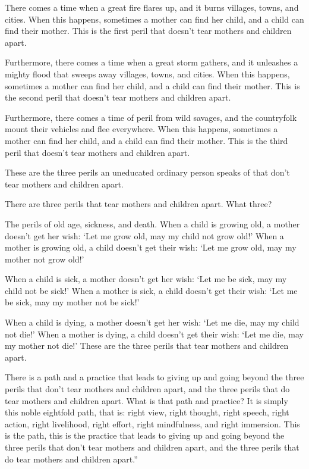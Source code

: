 \documentclass[12pt,openany]{book}%
\begin{document}
There comes a time when a great fire flares up, and it burns villages, towns, and cities. When this happens, sometimes a mother can find her child, and a child can find their mother. This is the first peril that doesn’t tear mothers and children apart. 

Furthermore, there comes a time when a great storm gathers, and it unleashes a mighty flood that sweeps away villages, towns, and cities. When this happens, sometimes a mother can find her child, and a child can find their mother. This is the second peril that doesn’t tear mothers and children apart. 

Furthermore, there comes a time of peril from wild savages, and the countryfolk mount their vehicles and flee everywhere. When this happens, sometimes a mother can find her child, and a child can find their mother. This is the third peril that doesn’t tear mothers and children apart. 

These are the three perils an uneducated ordinary person speaks of that don’t tear mothers and children apart. 

There are three perils that tear mothers and children apart. What three? 

The perils of old age, sickness, and death. When a child is growing old, a mother doesn’t get her wish: ‘Let me grow old, may my child not grow old!’ When a mother is growing old, a child doesn’t get their wish: ‘Let me grow old, may my mother not grow old!’ 

When a child is sick, a mother doesn’t get her wish: ‘Let me be sick, may my child not be sick!’ When a mother is sick, a child doesn’t get their wish: ‘Let me be sick, may my mother not be sick!’ 

When a child is dying, a mother doesn’t get her wish: ‘Let me die, may my child not die!’ When a mother is dying, a child doesn’t get their wish: ‘Let me die, may my mother not die!’ These are the three perils that tear mothers and children apart. 

There is a path and a practice that leads to giving up and going beyond the three perils that don’t tear mothers and children apart, and the three perils that do tear mothers and children apart. What is that path and practice? It is simply this noble eightfold path, that is: right view, right thought, right speech, right action, right livelihood, right effort, right mindfulness, and right immersion. This is the path, this is the practice that leads to giving up and going beyond the three perils that don’t tear mothers and children apart, and the three perils that do tear mothers and children apart.” 
\end{document}
